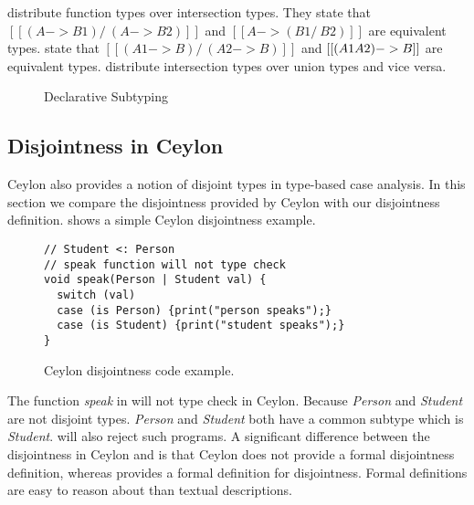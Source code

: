   distribute function types over intersection types.
They state that $[[(A -> B1) /\ (A -> B2)]]$ and $[[A -> (B1 /\ B2)]]$ are equivalent types.
 state that $[[(A1 -> B) /\ (A2 -> B)]]$ and $[[(A1 \/ A2) -> B]]$
are equivalent types.
 distribute intersection types over union types and vice versa.


\begin{figure}[t]
  \caption{Declarative Subtyping}
  \label{fig:discussion:ds}
\end{figure}

\subsection{Disjointness in Ceylon}
\label{sec:discussion:ceylon}


Ceylon also provides a notion of disjoint types in type-based case analysis. In this section
we compare the disjointness provided by Ceylon with our disjointness definition.
 shows a simple Ceylon disjointness example.


\begin{figure}[t]
\begin{lstlisting}[xleftmargin=.2\textwidth, xrightmargin=.2\textwidth]
// Student <: Person
// speak function will not type check
void speak(Person | Student val) {
  switch (val)
  case (is Person) {print("person speaks");}
  case (is Student) {print("student speaks");} 
}
\end{lstlisting}
\caption{Ceylon disjointness code example.}
\label{discussion:list:ceylon}
\end{figure}

\noindent The function \emph{speak} in  
will not type check in Ceylon. Because \emph{Person} and
\emph{Student} are not disjoint types. \emph{Person} and \emph{Student} both have a common
subtype which is \emph{Student}. \cal will also reject such programs.
A significant difference between the disjointness in Ceylon and \cal is that
Ceylon does not provide
a formal disjointness definition, whereas \cal provides a formal definition for
disjointness. Formal definitions are easy to reason about than textual descriptions. 


